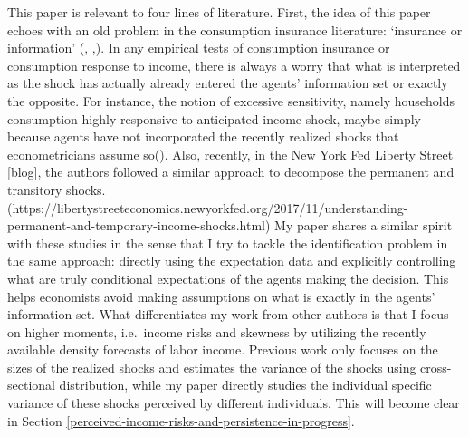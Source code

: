 \documentclass[12pt,notitlepage,onecolumn,aps,pra]{article}
\begin{document}
This paper is relevant to four lines of literature. First, the idea of
this paper echoes with an old problem in the consumption insurance
literature: `insurance or information' (\cite{pistaferri_superior_2001},
\cite{kaufmann_disentangling_2009},\cite{meghir_chapter_2011}). In any
empirical tests of consumption insurance or consumption response to
income, there is always a worry that what is interpreted as the shock
has actually already entered the agents' information set or exactly the
opposite. For instance, the notion of excessive sensitivity, namely
households consumption highly responsive to anticipated income shock,
maybe simply because agents have not incorporated the recently realized
shocks that econometricians assume so(\cite{flavin_excess_1988}). Also,
recently, in the New York Fed Liberty Street {[}blog{]}, the authors
followed a similar approach to decompose the permanent and transitory
shocks.
(https://libertystreeteconomics.newyorkfed.org/2017/11/understanding-permanent-and-temporary-income-shocks.html)
My paper shares a similar spirit with these studies in the sense that I
try to tackle the identification problem in the same approach: directly
using the expectation data and explicitly controlling what are truly
conditional expectations of the agents making the decision. This helps
economists avoid making assumptions on what is exactly in the agents'
information set. What differentiates my work from other authors is that
I focus on higher moments, i.e.~income risks and skewness by utilizing
the recently available density forecasts of labor income. Previous work
only focuses on the sizes of the realized shocks and estimates the
variance of the shocks using cross-sectional distribution, while my
paper directly studies the individual specific variance of these shocks
perceived by different individuals. This will become clear in Section
\ref{perceived-income-risks-and-persistence-in-progress}.
\end{document}
